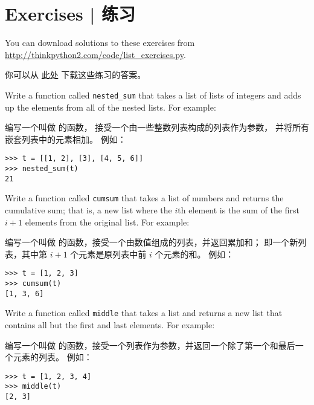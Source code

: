 \section{Exercises  |  练习}

You can download solutions to these exercises from
\url{http://thinkpython2.com/code/list_exercises.py}.

你可以从 \href{http://thinkpython2.com/code/list_exercises.py}{此处} 下载这些练习的答案。

\begin{exercise}

Write a function called \verb"nested_sum" that takes a list of lists
of integers and adds up the elements from all of the nested lists.
For example:

编写一个叫做  的函数， 接受一个由一些整数列表构成的列表作为参数， 并将所有嵌套列表中的元素相加。 例如：

\begin{lstlisting}
>>> t = [[1, 2], [3], [4, 5, 6]]
>>> nested_sum(t)
21
\end{lstlisting}

\end{exercise}

\begin{exercise}
\label{cumulative}

Write a function called {\tt cumsum} that takes a list of numbers and
returns the cumulative sum; that is, a new list where the $i$th
element is the sum of the first $i+1$ elements from the original list.
For example:

编写一个叫做  的函数，接受一个由数值组成的列表，并返回累加和；
即一个新列表，其中第 $i+1$ 个元素是原列表中前 $i$ 个元素的和。
例如：

\begin{lstlisting}
>>> t = [1, 2, 3]
>>> cumsum(t)
[1, 3, 6]
\end{lstlisting}

\end{exercise}

\begin{exercise}

Write a function called \verb"middle" that takes a list and
returns a new list that contains all but the first and last
elements.  For example:

编写一个叫做  的函数，接受一个列表作为参数，并返回一个除了第一个和最后一个元素的列表。
例如：


\begin{lstlisting}
>>> t = [1, 2, 3, 4]
>>> middle(t)
[2, 3]
\end{lstlisting}

\end{exercise}

